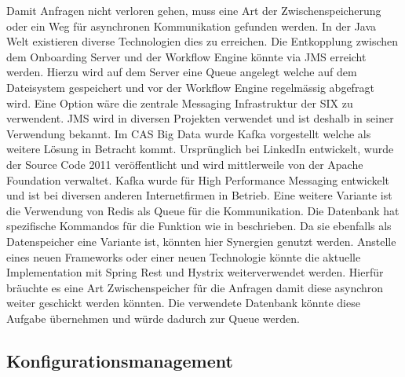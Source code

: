 Damit Anfragen nicht verloren gehen, muss eine Art der Zwischenspeicherung oder ein Weg für asynchronen Kommunikation gefunden werden. In der Java Welt existieren diverse Technologien dies zu erreichen.\newline
Die Entkopplung zwischen dem Onboarding Server und der Workflow Engine könnte via JMS erreicht werden. Hierzu wird auf dem Server eine Queue angelegt welche auf dem Dateisystem gespeichert und vor der Workflow Engine regelmässig abgefragt wird. Eine Option wäre die zentrale Messaging Infrastruktur der SIX zu verwendent. JMS wird in diversen Projekten verwendet und ist deshalb in seiner Verwendung bekannt.\newline
Im CAS Big Data wurde Kafka vorgestellt welche als weitere Lösung in Betracht kommt. Ursprünglich bei LinkedIn entwickelt, wurde der Source Code 2011 veröffentlicht und wird mittlerweile von der Apache Foundation verwaltet. Kafka wurde für High Performance Messaging entwickelt und ist bei diversen anderen Internetfirmen in Betrieb.\newline
Eine weitere Variante ist die Verwendung von Redis als Queue für die Kommunikation. Die Datenbank hat spezifische Kommandos für die Funktion wie in \cite{redisqueue} beschrieben. Da sie ebenfalls als Datenspeicher eine Variante ist, könnten hier Synergien genutzt werden.\newline
Anstelle eines neuen Frameworks oder einer neuen Technologie könnte die aktuelle Implementation mit Spring Rest und Hystrix weiterverwendet werden. Hierfür bräuchte es eine Art Zwischenspeicher für die Anfragen damit diese asynchron weiter geschickt werden könnten. Die verwendete Datenbank könnte diese Aufgabe übernehmen und würde dadurch zur Queue werden.

\subsection{Konfigurationsmanagement}

